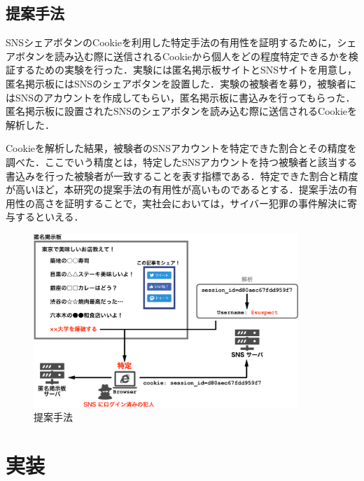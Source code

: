 \documentclass[10pt, a4paper]{jreport}
\begin{document}
\section{提案手法}
SNSシェアボタンのCookieを利用した特定手法の有用性を証明するために，シェアボタンを読み込む際に送信されるCookieから個人をどの程度特定できるかを検証するための実験を行った．実験には匿名掲示板サイトとSNSサイトを用意し，匿名掲示板にはSNSのシェアボタンを設置した．実験の被験者を募り，被験者にはSNSのアカウントを作成してもらい，匿名掲示板に書込みを行ってもらった．匿名掲示板に設置されたSNSのシェアボタンを読み込む際に送信されるCookieを解析した．

Cookieを解析した結果，被験者のSNSアカウントを特定できた割合とその精度を調べた．ここでいう精度とは，特定したSNSアカウントを持つ被験者と該当する書込みを行った被験者が一致することを表す指標である．特定できた割合と精度が高いほど，本研究の提案手法の有用性が高いものであるとする．提案手法の有用性の高さを証明することで，実社会においては，サイバー犯罪の事件解決に寄与するといえる．


\begin{figure}[H]
	\begin{center}
		\includegraphics[width=100mm]{figures/proposed_system_2.pdf}
	\end{center}
	\caption{提案手法}
	\label{fig: proposed_system_2}
\end{figure}











\chapter{実装}
\end{document}
